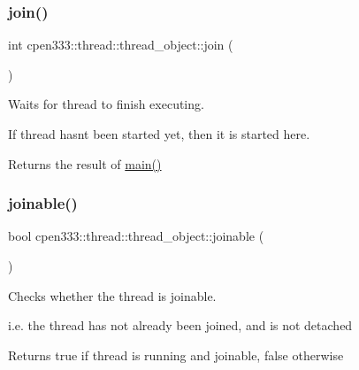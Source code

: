 \subsubsection{\texorpdfstring{join()}{join()}}
{\footnotesize\ttfamily int cpen333\+::thread\+::thread\+\_\+object\+::join (\begin{DoxyParamCaption}{ }\end{DoxyParamCaption})\hspace{0.3cm}{\ttfamily [inline]}}



Waits for thread to finish executing. 

If thread hasn\textquotesingle{}t been started yet, then it is started here.

\begin{DoxyReturn}{Returns}
the result of \hyperlink{classcpen333_1_1thread_1_1thread__object_adbd74f6f7461d90a1c12e8078aa5f3af}{main()} 
\end{DoxyReturn}
\mbox{\label{classcpen333_1_1thread_1_1thread__object_a374e31ea56accc37a3468012a411da5d}} 
\subsubsection{\texorpdfstring{joinable()}{joinable()}}
{\footnotesize\ttfamily bool cpen333\+::thread\+::thread\+\_\+object\+::joinable (\begin{DoxyParamCaption}{ }\end{DoxyParamCaption})\hspace{0.3cm}{\ttfamily [inline]}}



Checks whether the thread is joinable. 

i.\+e. the thread has not already been joined, and is not detached

\begin{DoxyReturn}{Returns}
true if thread is running and joinable, false otherwise 
\end{DoxyReturn}
\mbox{\label{classcpen333_1_1thread_1_1thread__object_adbd74f6f7461d90a1c12e8078aa5f3af}} 
